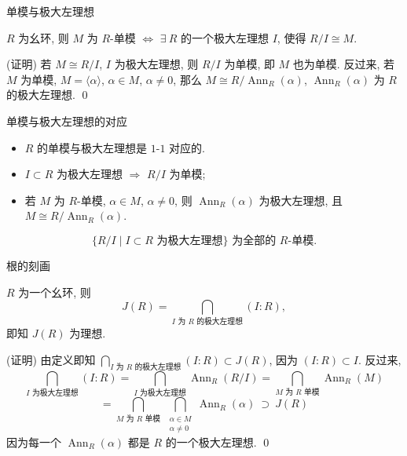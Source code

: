 
\begin{frame}{单模与极大左理想}

\begin{lem}[单模与极大左理想]
$R$ 为幺环, 则 $M$ 为 $R$-单模 $\iff$ $\exists\ R$ 的一个极大左理想 $I$,
使得 $R/I \cong M$.
\end{lem}

\startproof[bg=yellow, fg=red](证明)
若 $M \cong R/I$, $I$ 为极大左理想, 则 $R/I$ 为单模, 即 $M$ 也为单模.
反过来, 若 $M$ 为单模, $M = \langle \alpha \rangle$, $\alpha \in M$,
$\alpha \neq 0$, 那么 $M \cong R/\operatorname{Ann}_R(\alpha)$,
$\operatorname{Ann}_R(\alpha)$ 为 $R$ 的极大左理想.
\qed

\end{frame}


\begin{frame}{单模与极大左理想的对应}

\begin{itemize}
\item $R$ 的单模与极大左理想是 $1$-$1$ 对应的.
\item {} $I \subset R$ 为极大左理想 $\Longrightarrow$ $R/I$ 为单模;
\item {} 若 $M$ 为 $R$-单模, $\alpha \in M$, $\alpha \neq 0$,
  则 $\operatorname{Ann}_R(\alpha)$ 为极大左理想,
  且 $M \cong R/\operatorname{Ann}_R(\alpha)$.
\end{itemize}

\pause

\[
\big\{ R/I \;\big|\; I \subset R \text{ 为极大左理想} \big\}
\text{ 为全部的 } R\text{-单模}.
\]

\end{frame}


\begin{frame}{根的刻画}

\begin{lem}[根的刻画]
$R$ 为一个幺环, 则
\[
J(R) = \bigcap_{I \text{ 为 } R \text{ 的极大左理想}} (I:R) ,
\]
即知 $J(R)$ 为理想.
\end{lem}

\startproof[bg=yellow, fg=red](证明)
由定义即知
$\bigcap\limits_{I \text{ 为 } R \text{ 的极大左理想}} (I:R) \subset J(R)$,
因为 $(I:R) \subset I$.
\pause
反过来,
\[
\bigcap_{I \text{ 为极大左理想}} (I:R)
= \bigcap_{I \text{ 为极大左理想}} \operatorname{Ann}_R(R/I)
= \bigcap_{M \text{ 为 } R \text{ 单模}} \operatorname{Ann}_R(M)
\]
\[
= \bigcap_{M \text{ 为 } R \text{ 单模}}\ \bigcap_{\substack{\alpha \in M \\ \alpha \neq 0}}
\operatorname{Ann}_R(\alpha)
\ \supset\ J(R)
\]
因为每一个 $\operatorname{Ann}_R(\alpha)$ 都是 $R$ 的一个极大左理想.
\qed

\end{frame}



